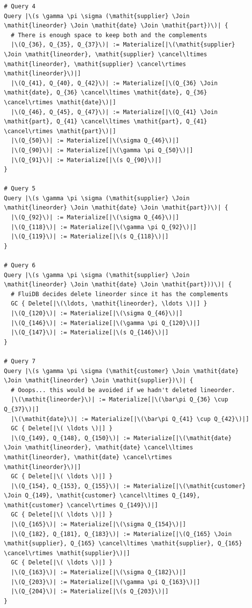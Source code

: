 \begin{code}
\begin{verbatim}
# Query 4
Query |\(s \gamma \pi \sigma (\mathit{supplier} \Join \mathit{lineorder} \Join \mathit{date} \Join \mathit{part})\)| {
  # There is enough space to keep both and the complements
  |\(Q_{36}, Q_{35}, Q_{37}\)| := Materialize[|\(\mathit{supplier} \Join \mathit{lineorder}, \mathit{supplier} \cancel\ltimes \mathit{lineorder}, \mathit{supplier} \cancel\rtimes \mathit{lineorder}\)|]
  |\(Q_{41}, Q_{40}, Q_{42}\)| := Materialize[|\(Q_{36} \Join \mathit{date}, Q_{36} \cancel\ltimes \mathit{date}, Q_{36} \cancel\rtimes \mathit{date}\)|]
  |\(Q_{46}, Q_{45}, Q_{47}\)| := Materialize[|\(Q_{41} \Join \mathit{part}, Q_{41} \cancel\ltimes \mathit{part}, Q_{41} \cancel\rtimes \mathit{part}\)|]
  |\(Q_{50}\)| := Materialize[|\(\sigma Q_{46}\)|]
  |\(Q_{90}\)| := Materialize[|\(\gamma \pi Q_{50}\)|]
  |\(Q_{91}\)| := Materialize[|\(s Q_{90}\)|]
}

# Query 5
Query |\(s \gamma \pi \sigma (\mathit{supplier} \Join \mathit{lineorder} \Join \mathit{date} \Join \mathit{part})\)| {
  |\(Q_{92}\)| := Materialize[|\(\sigma Q_{46}\)|]
  |\(Q_{118}\)| := Materialize[|\(\gamma \pi Q_{92}\)|]
  |\(Q_{119}\)| := Materialize[|\(s Q_{118}\)|]
}

# Query 6
Query |\(s \gamma \pi \sigma (\mathit{supplier} \Join \mathit{lineorder} \Join \mathit{date} \Join \mathit{part}))\)| {
  # FluiDB decides delete lineorder since it has the complements
  GC { Delete[|\(\ldots, \mathit{lineorder}, \ldots \)|] }
  |\(Q_{120}\)| := Materialize[|\(\sigma Q_{46}\)|]
  |\(Q_{146}\)| := Materialize[|\(\gamma \pi Q_{120}\)|]
  |\(Q_{147}\)| := Materialize[|\(s Q_{146}\)|]
}

# Query 7
Query |\(s \gamma \pi \sigma (\mathit{customer} \Join \mathit{date} \Join \mathit{lineorder} \Join \mathit{supplier})\)| {
  # Ooops... this would be avoided if we hadn't deleted lineorder.
  |\(\mathit{lineorder}\)| := Materialize[|\(\bar\pi Q_{36} \cup Q_{37}\)|]
  |\(\mathit{date}\)| := Materialize[|\(\bar\pi Q_{41} \cup Q_{42}\)|]
  GC { Delete[|\( \ldots \)|] }
  |\(Q_{149}, Q_{148}, Q_{150}\)| := Materialize[|\(\mathit{date} \Join \mathit{lineorder}, \mathit{date} \cancel\ltimes \mathit{lineorder}, \mathit{date} \cancel\rtimes \mathit{lineorder}\)|]
  GC { Delete[|\( \ldots \)|] }
  |\(Q_{154}, Q_{153}, Q_{155}\)| := Materialize[|\(\mathit{customer} \Join Q_{149}, \mathit{customer} \cancel\ltimes Q_{149}, \mathit{customer} \cancel\rtimes Q_{149}\)|]
  GC { Delete[|\( \ldots \)|] }
  |\(Q_{165}\)| := Materialize[|\(\sigma Q_{154}\)|]
  |\(Q_{182}, Q_{181}, Q_{183}\)| := Materialize[|\(Q_{165} \Join \mathit{supplier}, Q_{165} \cancel\ltimes \mathit{supplier}, Q_{165} \cancel\rtimes \mathit{supplier}\)|]
  GC { Delete[|\( \ldots \)|] }
  |\(Q_{163}\)| := Materialize[|\(\sigma Q_{182}\)|]
  |\(Q_{203}\)| := Materialize[|\(\gamma \pi Q_{163}\)|]
  |\(Q_{204}\)| := Materialize[|\(s Q_{203}\)|]
}


\end{verbatim}
\end{code}
